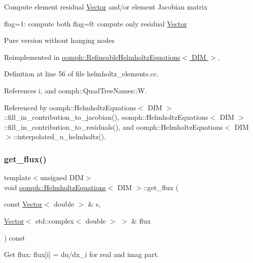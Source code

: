 Compute element residual \hyperlink{classoomph_1_1Vector}{Vector} and/or element Jacobian matrix

flag=1\+: compute both flag=0\+: compute only residual \hyperlink{classoomph_1_1Vector}{Vector}

Pure version without hanging nodes 

Reimplemented in \hyperlink{classoomph_1_1RefineableHelmholtzEquations_a3762ea1eef3fa5e835686643c25e8cec}{oomph\+::\+Refineable\+Helmholtz\+Equations$<$ D\+I\+M $>$}.



Definition at line 56 of file helmholtz\+\_\+elements.\+cc.



References i, and oomph\+::\+Quad\+Tree\+Names\+::W.



Referenced by oomph\+::\+Helmholtz\+Equations$<$ D\+I\+M $>$\+::fill\+\_\+in\+\_\+contribution\+\_\+to\+\_\+jacobian(), oomph\+::\+Helmholtz\+Equations$<$ D\+I\+M $>$\+::fill\+\_\+in\+\_\+contribution\+\_\+to\+\_\+residuals(), and oomph\+::\+Helmholtz\+Equations$<$ D\+I\+M $>$\+::interpolated\+\_\+u\+\_\+helmholtz().

\mbox{\label{classoomph_1_1HelmholtzEquations_a5a572831004e521f58d5a54c8392262f}} 
\subsubsection{\texorpdfstring{get\+\_\+flux()}{get\_flux()}}
{\footnotesize\ttfamily template$<$unsigned D\+IM$>$ \\
void \hyperlink{classoomph_1_1HelmholtzEquations}{oomph\+::\+Helmholtz\+Equations}$<$ D\+IM $>$\+::get\+\_\+flux (\begin{DoxyParamCaption}\item[{const \hyperlink{classoomph_1_1Vector}{Vector}$<$ double $>$ \&}]{s,  }\item[{\hyperlink{classoomph_1_1Vector}{Vector}$<$ std\+::complex$<$ double $>$ $>$ \&}]{flux }\end{DoxyParamCaption}) const\hspace{0.3cm}{\ttfamily [inline]}}



Get flux\+: flux\mbox{[}i\mbox{]} = du/dx\+\_\+i for real and imag part. 



